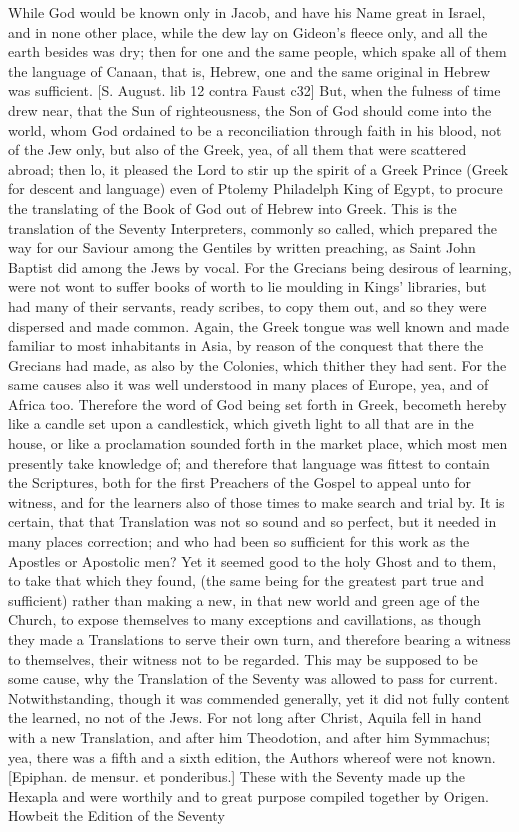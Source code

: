 {\par }{\IP While God would be known only in Jacob, and have his Name great in Israel, and in none other place, while the dew lay on Gideon’s fleece only, and all the earth besides was dry; then for one and the same people, which spake all of them the language of Canaan, that is, Hebrew, one and the same original in Hebrew was sufficient. [S. August. lib 12 contra Faust c32] But, when the fulness of time drew near, that the Sun of righteousness, the Son of God should come into the world, whom God ordained to be a reconciliation through faith in his blood, not of the Jew only, but also of the Greek, yea, of all them that were scattered abroad; then lo, it pleased the Lord to stir up the spirit of a Greek Prince (Greek for descent and language) even of Ptolemy Philadelph King of Egypt, to procure the translating of the Book of God out of Hebrew into Greek. This is the translation of the Seventy Interpreters, commonly so called, which prepared the way for our Saviour among the Gentiles by written preaching, as Saint John Baptist did among the Jews by vocal. For the Grecians being desirous of learning, were not wont to suffer books of worth to lie moulding in Kings’ libraries, but had many of their servants, ready scribes, to copy them out, and so they were dispersed and made common. Again, the Greek tongue was well known and made familiar to most inhabitants in Asia, by reason of the conquest that there the Grecians had made, as also by the Colonies, which thither they had sent. For the same causes also it was well understood in many places of Europe, yea, and of Africa too. Therefore the word of God being set forth in Greek, becometh hereby like a candle set upon a candlestick, which giveth light to all that are in the house, or like a proclamation sounded forth in the market place, which most men presently take knowledge of; and therefore that language was fittest to contain the Scriptures, both for the first Preachers of the Gospel to appeal unto for witness, and for the learners also of those times to make search and trial by. It is certain, that that Translation was not so sound and so perfect, but it needed in many places correction; and who had been so sufficient for this work as the Apostles or Apostolic men? Yet it seemed good to the holy Ghost and to them, to take that which they found, (the same being for the greatest part true and sufficient) rather than making a new, in that new world and green age of the Church, to expose themselves to many exceptions and cavillations, as though they made a Translations to serve their own turn, and therefore bearing a witness to themselves, their witness not to be regarded. This may be supposed to be some cause, why the Translation of the Seventy was allowed to pass for current. Notwithstanding, though it was commended generally, yet it did not fully content the learned, no not of the Jews. For not long after Christ, Aquila fell in hand with a new Translation, and after him Theodotion, and after him Symmachus; yea, there was a fifth and a sixth edition, the Authors whereof were not known. [Epiphan. de mensur. et ponderibus.] These with the Seventy made up the Hexapla and were worthily and to great purpose compiled together by Origen. Howbeit the Edition of the Seventy }
